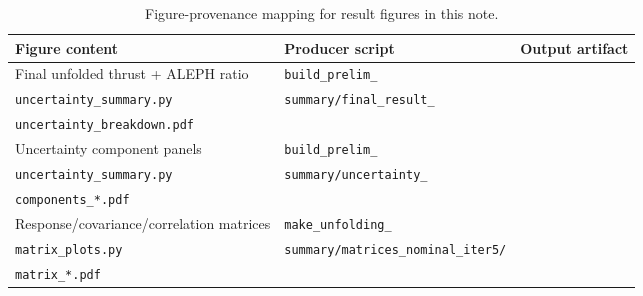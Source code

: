 \begin{table}[t!]
\centering
\scriptsize
\begin{tabularx}{0.98\textwidth}{p{}p{}X}
\hline
Figure content & Producer script & Output artifact \\
\hline
Final unfolded thrust + ALEPH ratio & \texttt{build\_prelim\_}\\\texttt{uncertainty\_summary.py} & \texttt{summary/final\_result\_}\\\texttt{uncertainty\_breakdown.pdf} \\
Uncertainty component panels & \texttt{build\_prelim\_}\\\texttt{uncertainty\_summary.py} & \texttt{summary/uncertainty\_}\\\texttt{components\_*.pdf} \\
Response/covariance/correlation matrices & \texttt{make\_unfolding\_}\\\texttt{matrix\_plots.py} & \texttt{summary/matrices\_nominal\_iter5/}\\\texttt{matrix\_*.pdf} \\
\hline
\end{tabularx}
\normalsize
\caption{Figure-provenance mapping for result figures in this note.}
\label{tab:results_figure_provenance}
\end{table}
